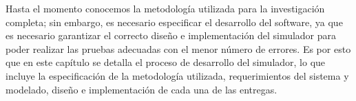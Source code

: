 Hasta el momento conocemos la metodología utilizada para la investigación completa; sin embargo, es necesario especificar el desarrollo del software, ya que es necesario garantizar el correcto diseño e implementación del simulador para poder realizar las pruebas adecuadas con el menor número de errores. Es por esto que en este capítulo se detalla el proceso de desarrollo del simulador, lo que incluye la especificación de la metodología utilizada, requerimientos del sistema y modelado, diseño e implementación de cada una de las entregas.
